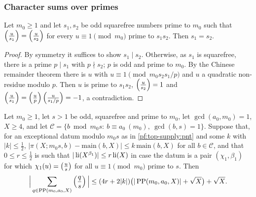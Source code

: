 \subsubsection{Character sums over primes}

\begin{lemma}\label{pf:top-supply:separate}
Let $m_0\ge1$ and let $s_1,s_2$ be odd squarefree numbers prime to $m_0$ such that
$\left(\frac{u}{s_1}\right)=\left(\frac{u}{s_2}\right)$ for every $u\equiv1\pmod{m_0}$ prime to $s_1s_2$. Then $s_1=s_2$.
\end{lemma}

\begin{proof}
By symmetry it suffices to show $s_1\mid s_2$. Otherwise, as $s_1$ is squarefree, there is a prime $p\mid s_1$ with
$p\nmid s_2$; $p$ is odd and prime to $m_0$. By the Chinese remainder theorem there is $u$ with $u\equiv1\pmod{m_0s_2s_1/p}$
and $u$ a quadratic non-residue modulo $p$. Then $u$ is prime to $s_1s_2$, $\left(\frac{u}{s_2}\right)=1$ and
$\left(\frac{u}{s_1}\right)=\left(\frac{u}{p}\right)\left(\frac{u}{s_1/p}\right)=-1$, a contradiction.
\end{proof}

\begin{lemma}\label{pf:top-supply:twistone}
Let $m_0\ge1$, let $s>1$ be odd, squarefree and prime to $m_0$, let $\gcd(a_0,m_0)=1$, $X\ge4$, and let
$\mathcal C=\{b\bmod m_0s:\ b\equiv a_0\ (m_0),\ \gcd(b,s)=1\}$. Suppose that, for an exceptional datum modulo $m_0s$
as in \cref{pf:top-supply:pnt} and some $k$ with $|k|\le\frac12$, $|\pi(X;m_0s,b)-\mathrm{main}(b,X)|\le
k\,\mathrm{main}(b,X)$ for all $b\in\mathcal C$, and that $0\le r\le\frac12$ is such that
$|\operatorname{li}(X^{\beta_1})|\le r\operatorname{li}(X)$ in case the datum is a pair $(\chi_1,\beta_1)$ for which $\chi_1(u)=
\left(\frac{u}{s}\right)$ for all $u\equiv1\pmod{m_0}$ prime to $s$. Then
\[
\Big|\sum_{q\in\operatorname{PP}(m_0,a_0,X)}\left(\frac{q}{s}\right)\Big|\le(4r+2|k|)\big(|\operatorname{PP}(m_0,a_0,X)|+\sqrt X\big)+\sqrt X.
\]
\end{lemma}

